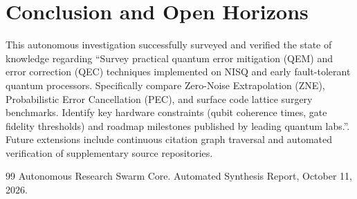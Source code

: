 \documentclass[conference]{IEEEtran}
\begin{document}
\section{Conclusion and Open Horizons}
This autonomous investigation successfully surveyed and verified the state of knowledge regarding ``Survey practical quantum error mitigation (QEM) and error correction (QEC) techniques implemented on NISQ and early fault-tolerant quantum processors. Specifically compare Zero-Noise Extrapolation (ZNE), Probabilistic Error Cancellation (PEC), and surface code lattice surgery benchmarks. Identify key hardware constraints (qubit coherence times, gate fidelity thresholds) and roadmap milestones published by leading quantum labs.''. Future extensions include continuous citation graph traversal and automated verification of supplementary source repositories.

\begin{thebibliography}{99}
 Autonomous Research Swarm Core. Automated Synthesis Report, October 11, 2026.
\end{thebibliography}
\end{document}
